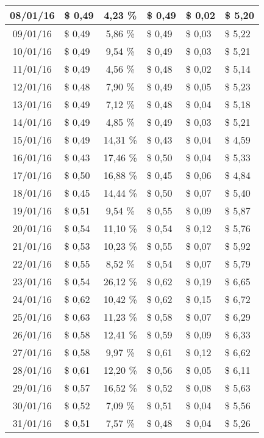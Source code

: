 \begin{center}
\begin{small}
\begin{longtable}{|c|l|c|l|l|l|}
08/01/16 & \$ 0,49 & 4,23 \% & \$ 0,49 & \$ 0,02 & \$ 5,20 \\ \hline
09/01/16 & \$ 0,49 & 5,86 \% & \$ 0,49 & \$ 0,03 & \$ 5,22 \\ \hline
10/01/16 & \$ 0,49 & 9,54 \% & \$ 0,49 & \$ 0,03 & \$ 5,21 \\ \hline
11/01/16 & \$ 0,49 & 4,56 \% & \$ 0,48 & \$ 0,02 & \$ 5,14 \\ \hline
12/01/16 & \$ 0,48 & 7,90 \% & \$ 0,49 & \$ 0,05 & \$ 5,23 \\ \hline
13/01/16 & \$ 0,49 & 7,12 \% & \$ 0,48 & \$ 0,04 & \$ 5,18 \\ \hline
14/01/16 & \$ 0,49 & 4,85 \% & \$ 0,49 & \$ 0,03 & \$ 5,21 \\ \hline
15/01/16 & \$ 0,49 & 14,31 \% & \$ 0,43 & \$ 0,04 & \$ 4,59 \\ \hline
16/01/16 & \$ 0,43 & 17,46 \% & \$ 0,50 & \$ 0,04 & \$ 5,33 \\ \hline
17/01/16 & \$ 0,50 & 16,88 \% & \$ 0,45 & \$ 0,06 & \$ 4,84 \\ \hline
18/01/16 & \$ 0,45 & 14,44 \% & \$ 0,50 & \$ 0,07 & \$ 5,40 \\ \hline
19/01/16 & \$ 0,51 & 9,54 \% & \$ 0,55 & \$ 0,09 & \$ 5,87 \\ \hline
20/01/16 & \$ 0,54 & 11,10 \% & \$ 0,54 & \$ 0,12 & \$ 5,76 \\ \hline
21/01/16 & \$ 0,53 & 10,23 \% & \$ 0,55 & \$ 0,07 & \$ 5,92 \\ \hline
22/01/16 & \$ 0,55 & 8,52 \% & \$ 0,54 & \$ 0,07 & \$ 5,79 \\ \hline
23/01/16 & \$ 0,54 & 26,12 \% & \$ 0,62 & \$ 0,19 & \$ 6,65 \\ \hline
24/01/16 & \$ 0,62 & 10,42 \% & \$ 0,62 & \$ 0,15 & \$ 6,72 \\ \hline
25/01/16 & \$ 0,63 & 11,23 \% & \$ 0,58 & \$ 0,07 & \$ 6,29 \\ \hline
26/01/16 & \$ 0,58 & 12,41 \% & \$ 0,59 & \$ 0,09 & \$ 6,33 \\ \hline
27/01/16 & \$ 0,58 & 9,97 \% & \$ 0,61 & \$ 0,12 & \$ 6,62 \\ \hline
28/01/16 & \$ 0,61 & 12,20 \% & \$ 0,56 & \$ 0,05 & \$ 6,11 \\ \hline
29/01/16 & \$ 0,57 & 16,52 \% & \$ 0,52 & \$ 0,08 & \$ 5,63 \\ \hline
30/01/16 & \$ 0,52 & 7,09 \% & \$ 0,51 & \$ 0,04 & \$ 5,56 \\ \hline
31/01/16 & \$ 0,51 & 7,57 \% & \$ 0,48 & \$ 0,04 & \$ 5,26 \\ \hline

\end{longtable}
\end{small}
\end{center}
